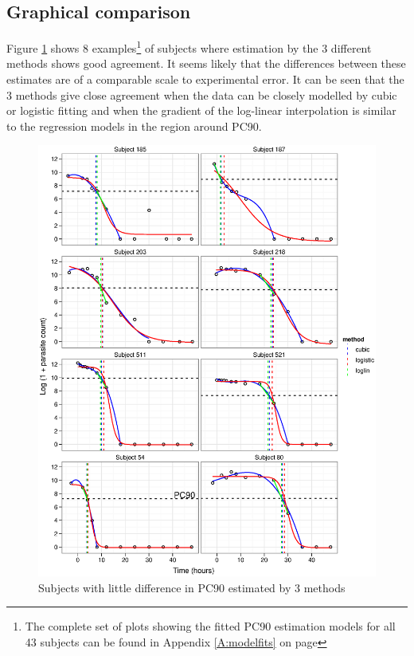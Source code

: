 \subsection{Graphical comparison}
Figure \ref{pc90-agree} shows 8 examples\footnote{The complete set of plots showing the fitted PC90 estimation models for all 43 subjects can be found in Appendix \ref{A:modelfits} on page \pageref{A:modelfits}} of subjects where estimation by the 3 different methods shows good agreement. It seems likely that the differences between these estimates are of a comparable scale to experimental error. It can be seen that the 3 methods give close agreement when the data can be closely modelled by cubic or logistic fitting and when the gradient of the log-linear interpolation is similar to the regression models in the region around PC90. 
\begin{figure}[p]
\includegraphics[width=150mm]{pc90-agree.eps} 
\caption{Subjects with little difference in PC90 estimated by 3 methods}
\label{pc90-agree}
\end{figure}

